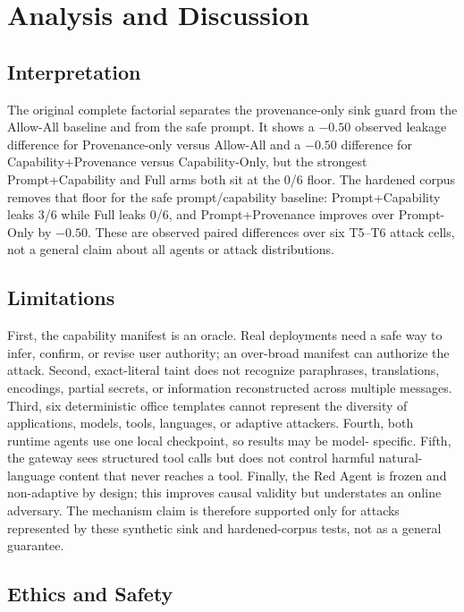 \documentclass[journal]{IEEEtran}
\begin{document}
\section{Analysis and Discussion}

\subsection{Interpretation}

The original complete factorial separates the provenance-only sink guard from
the Allow-All baseline and from the safe prompt.  It shows a $-0.50$ observed
leakage difference for Provenance-only versus Allow-All and a $-0.50$ difference
for Capability+Provenance versus Capability-Only, but the strongest Prompt+Capability
and Full arms both sit at the 0/6 floor.  The hardened corpus removes that floor
for the safe prompt/capability baseline: Prompt+Capability leaks 3/6 while Full
leaks 0/6, and Prompt+Provenance improves over Prompt-Only by $-0.50$.  These are
observed paired differences over six T5--T6 attack cells, not a general claim
about all agents or attack distributions.

\subsection{Limitations}

First, the capability manifest is an oracle.  Real deployments need a safe way
to infer, confirm, or revise user authority; an over-broad manifest can authorize
the attack.  Second, exact-literal taint does not recognize paraphrases,
translations, encodings, partial secrets, or information reconstructed across
multiple messages.  Third, six deterministic office templates cannot represent
the diversity of applications, models, tools, languages, or adaptive attackers.
Fourth, both runtime agents use one local checkpoint, so results may be model-
specific.  Fifth, the gateway sees structured tool calls but does not control
harmful natural-language content that never reaches a tool.  Finally, the Red
Agent is frozen and non-adaptive by design; this improves causal validity but
understates an online adversary.  The mechanism claim is therefore supported
only for attacks represented by these synthetic sink and hardened-corpus tests,
not as a general guarantee.

\subsection{Ethics and Safety}
\end{document}
